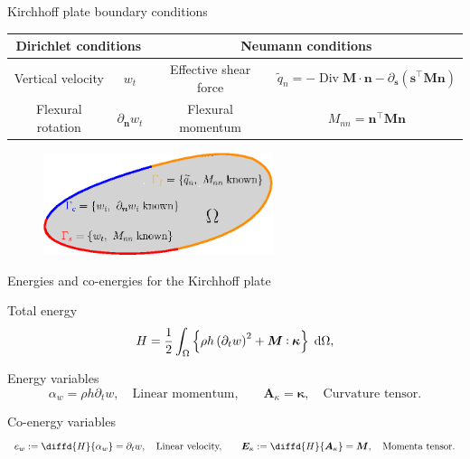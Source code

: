 \documentclass[aspectratio=169]{ISAE-Beamer}
\DeclareMathOperator*{\Div}{Div}
\def\onedot{$\mathsurround0pt\ldotp$}
\def\cddot{%
	\mathbin{\vcenter{\baselineskip.67ex
			\hbox{\onedot}\hbox{\onedot}}%
}}
\begin{document}
\begin{frame}{Kirchhoff plate boundary conditions}

\begin{table}
	\centering
	\begin{tabular}{cc|cc}
		\hline 
		\multicolumn{2}{c}{Dirichlet conditions}&  \multicolumn{2}{c}{Neumann conditions} \\ 
		\hline 
		Vertical velocity  & $w_t$ & Effective shear force  & $\widetilde{q}_n = -\Div \bm{M} \cdot \bm{n} - \partial_{\bm{s}} (\bm{s}^\top \bm{M} \bm{n})$ \\ 
		Flexural rotation  & $\partial_{\bm{n}} w_t $  & Flexural momentum & $M_{nn} = \bm{n}^\top\bm{M}\bm{n}$ \\  
		\hline 
	\end{tabular}
\end{table}

\begin{figure}[tb]
	\centering
	\includegraphics[width=0.6\textwidth]{part_2/kirchh_plate_bcs.eps}
\end{figure}
		
\end{frame}

\begin{frame}{Energies and co-energies for the Kirchhoff plate}
\begin{overlayarea}{\textwidth}{\textheight}
\begin{block}{Total energy}
	\setlength{\abovedisplayskip}{1pt}
	\setlength{\belowdisplayskip}{1pt}
	\begin{equation*}
	H = \frac{1}{2} \int_{\Omega}  \left\{ \rho h \left(\partial_t {w} \right)^2 + \bm{M} \cddot \bm{\kappa}\right\}  \d\Omega, 
	\end{equation*}
\end{block}
	
\begin{block}{Energy variables}
	\begin{equation*}
	\alpha_w = \rho h \partial_t {w}, \quad \text{Linear momentum,} \qquad
	\bm{A}_{\kappa} = \bm{\kappa}, \quad \text{Curvature tensor.} 
	\end{equation*}
\end{block}	

\begin{block}{Co-energy variables}
	\begin{equation*}
	e_w := \diffd{H}{\alpha_w} = \partial_t {w},  \quad \text{Linear velocity,} \qquad
	\bm{E}_{\kappa} := \diffd{H}{\bm{A}_{\kappa}} = \bm{M}, \quad \text{Momenta tensor.}
	\end{equation*}
\end{block}	
	
\end{overlayarea}	
\end{frame}
\end{document}
